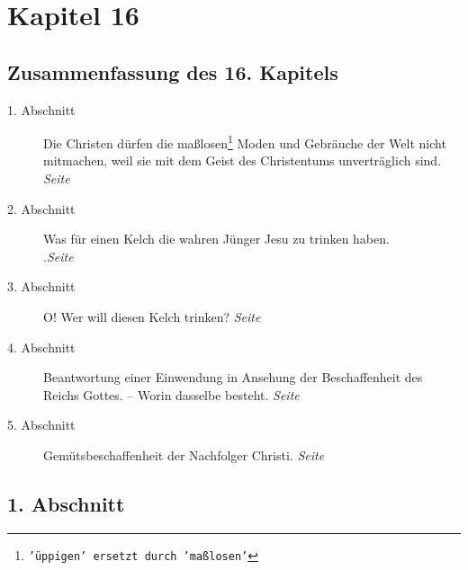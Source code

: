 \chapter{Kapitel 16} \label{kap16}
\section{Zusammenfassung des 16. Kapitels}

\begin{description}
\item[1. Abschnitt] Die Christen dürfen die maßlosen\footnote{\texttt{'üppigen'
ersetzt durch 'maßlosen'}}
Moden und Gebräuche der Welt
nicht mitmachen, weil sie mit dem Geist des Christentums unverträglich sind.
\dotfill \textit{Seite~\pageref{kap16_ab1}}\\
\item[2. Abschnitt] Was für einen Kelch die wahren Jünger Jesu zu trinken haben.\\
.\dotfill \textit{Seite~\pageref{kap16_ab2}}\\
\item[3. Abschnitt] O! Wer will diesen Kelch trinken?
\dotfill \textit{Seite~\pageref{kap16_ab3}}\\
\item[4. Abschnitt] Beantwortung einer Einwendung in Ansehung der Beschaffenheit
des Reichs Gottes. -- Worin dasselbe besteht.
\dotfill \textit{Seite~\pageref{kap16_ab4}}\\
\item[5. Abschnitt] Gemütsbeschaffenheit der Nachfolger Christi.
\dotfill \textit{Seite~\pageref{kap16_ab5}}\\

\end{description}

\newpage

\section{1. Abschnitt} \label{kap16_ab1}

